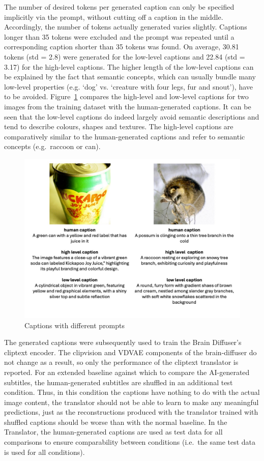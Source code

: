 The number of desired tokens per generated caption can only be specified implicitly via the prompt, without cutting off a caption in the middle. Accordingly, the number of tokens actually generated varies slightly. Captions longer than 35 tokens were excluded and the prompt was repeated until a corresponding caption shorter than 35 tokens was found. On average, 30.81 tokens (std = 2.8) were generated for the low-level captions and 22.84 (std = 3.17) for the high-level captions. The higher length of the low-level captions can be explained by the fact that semantic concepts, which can usually bundle many low-level properties (e.g. `dog' vs. `creature with four legs, fur and snout'), have to be avoided. Figure~\ref{fig:aicap_caption_samples} compares the high-level and low-level captions for two images from the training dataset with the human-generated captions. It can be seen that the low-level captions do indeed largely avoid semantic descriptions and tend to describe colours, shapes and textures. The high-level captions are comparatively similar to the human-generated captions and refer to semantic concepts (e.g.\ raccoon or can).

\begin{figure}[ht]
    \centering
    \includegraphics[width=1\textwidth]{plots/aicap_samples.jpeg}
    \caption{Captions with different prompts}\label{fig:aicap_caption_samples}
\end{figure}

The generated captions were subsequently used to train the Brain Diffuser's cliptext encoder. The clipvision and VDVAE components of the brain-diffuser do not change as a result, so only the performance of the cliptext translator is reported. For an extended baseline against which to compare the AI-generated subtitles, the human-generated subtitles are shuffled in an additional test condition. Thus, in this condition the captions have nothing to do with the actual image content, the translator should not be able to learn to make any meaningful predictions, just as the reconstructions produced with the translator trained with shuffled captions should be worse than with the normal baseline. In the Translator, the human-generated captions are used as test data for all comparisons to ensure comparability between conditions (i.e.\ the same test data is used for all conditions). 

